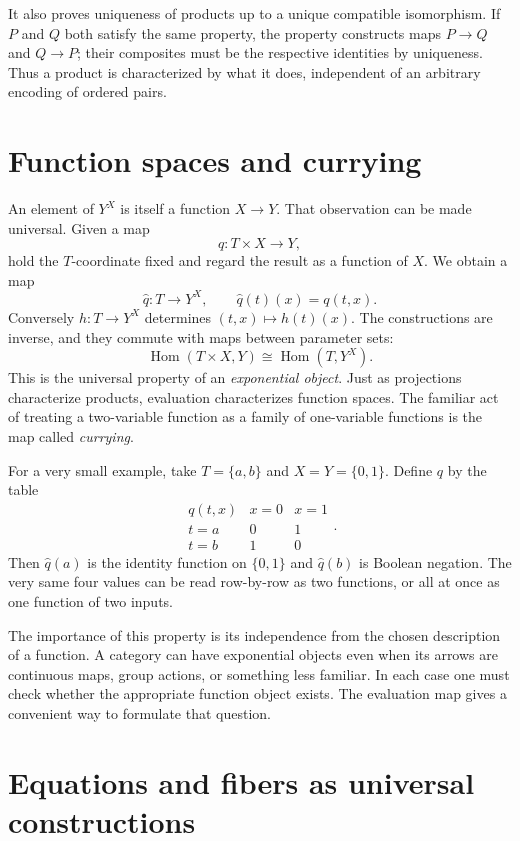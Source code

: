 It also proves uniqueness of products up to a unique compatible isomorphism. If \(P\) and \(Q\) both satisfy the same property, the property constructs maps \(P\to Q\) and \(Q\to P\); their composites must be the respective identities by uniqueness. Thus a product is characterized by what it does, independent of an arbitrary encoding of ordered pairs.

\section{Function spaces and currying}

An element of $Y^X$ is itself a function $X\to Y$. That observation can be made universal. Given a map
\[
 q:T\times X\longrightarrow Y,
\]
hold the $T$-coordinate fixed and regard the result as a function of $X$. We obtain a map
\[
 \widehat q:T\longrightarrow Y^X,\qquad
 \widehat q(t)(x)=q(t,x).
\]
Conversely $h:T\to Y^X$ determines $(t,x)\mapsto h(t)(x)$. The constructions are inverse, and they commute with maps between parameter sets:
\[
 \boxed{\operatorname{Hom}(T\times X,Y)
          \cong\operatorname{Hom}(T,Y^X).}
\]
This is the universal property of an \emph{exponential object}. Just as projections characterize products, evaluation characterizes function spaces. The familiar act of treating a two-variable function as a family of one-variable functions is the map called \emph{currying}.

For a very small example, take $T=\{a,b\}$ and $X=Y=\{0,1\}$. Define $q$ by the table
\[
\begin{array}{c|cc}
 q(t,x)&x=0&x=1\\\hline
 t=a&0&1\\
 t=b&1&0
\end{array}.
\]
Then $\widehat q(a)$ is the identity function on $\{0,1\}$ and $\widehat q(b)$ is Boolean negation. The very same four values can be read row-by-row as two functions, or all at once as one function of two inputs.

The importance of this property is its independence from the chosen description of a function. A category can have exponential objects even when its arrows are continuous maps, group actions, or something less familiar. In each case one must check whether the appropriate function object exists. The evaluation map gives a convenient way to formulate that question.

\section{Equations and fibers as universal constructions}

